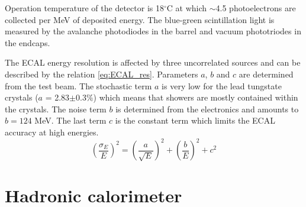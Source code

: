 \par Operation temperature of the detector is 18$^\circ$C at which $\sim$4.5 photoelectrons are collected per MeV of deposited energy. The blue-green scintillation light is measured by the avalanche photodiodes in the barrel and vacuum phototriodes in the endcaps.   
\par The ECAL energy resolution is affected by three uncorrelated sources and can be described by the relation \ref{eq:ECAL_res}. Parameters $a$, $b$ and $c$ are determined from the test beam. The stochastic term $a$ is very low for the lead tungstate crystals ($a$ = 2.83$\pm$0.3$\%$) which means that showers are mostly contained within the crystals. The noise term $b$ is determined from the electronics and amounts to $b=124$ MeV. The last term $c$ is the constant term which limits the ECAL accuracy at high energies.   
\begin{equation}
\left(\frac{\sigma_E}{E}\right)^2 = \left(\frac{a}{\sqrt{E}}\right)^2 + \left(\frac{b}{E}\right)^2 + c^2
\label{eq:ECAL_res}
\end{equation}   


\section{Hadronic calorimeter}

